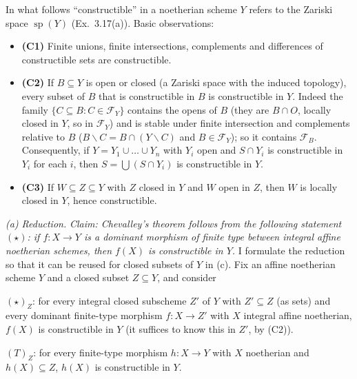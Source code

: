 \documentclass[11pt]{article}
\begin{document}
\pf
In what follows ``constructible'' in a noetherian scheme $Y$ refers to the Zariski space $\operatorname{sp}(Y)$ (Ex.~3.17(a)). Basic observations:
\begin{itemize}
\item \textbf{(C1)} Finite unions, finite intersections, complements and differences of constructible sets are constructible.
\item \textbf{(C2)} If $B\subseteq Y$ is open or closed (a Zariski space with the induced topology), every subset of $B$ that is constructible in $B$ is constructible in $Y$. Indeed the family $\{C\subseteq B:C\in\mathcal F_Y\}$ contains the opens of $B$ (they are $B\cap O$, locally closed in $Y$, so in $\mathcal F_Y$) and is stable under finite intersection and complements relative to $B$ ($B\smallsetminus C=B\cap(Y\smallsetminus C)$ and $B\in\mathcal F_Y$); so it contains $\mathcal F_B$. Consequently, if $Y=Y_1\cup\dots\cup Y_n$ with $Y_i$ open and $S\cap Y_i$ is constructible in $Y_i$ for each $i$, then $S=\bigcup(S\cap Y_i)$ is constructible in $Y$.
\item \textbf{(C3)} If $W\subseteq Z\subseteq Y$ with $Z$ closed in $Y$ and $W$ open in $Z$, then $W$ is locally closed in $Y$, hence constructible.
\end{itemize}

\emph{(a) Reduction.} \emph{Claim: Chevalley's theorem follows from the following statement $(\star)$: if $f:X\to Y$ is a dominant morphism of finite type between integral affine noetherian schemes, then $f(X)$ is constructible in $Y$.} I formulate the reduction so that it can be reused for closed subsets of $Y$ in (c). Fix an affine noetherian scheme $Y$ and a closed subset $Z\subseteq Y$, and consider

$(\star)_Z$: for every integral closed subscheme $Z'$ of $Y$ with $Z'\subseteq Z$ (as sets) and every dominant finite-type morphism $f:X\to Z'$ with $X$ integral affine noetherian, $f(X)$ is constructible in $Y$ (it suffices to know this in $Z'$, by (C2)).

$(T)_Z$: for every finite-type morphism $h:X\to Y$ with $X$ noetherian and $h(X)\subseteq Z$, $h(X)$ is constructible in $Y$.
\end{document}
